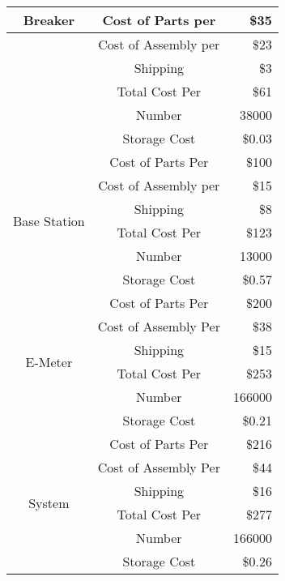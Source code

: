 \begin{table}
\caption{}
\begin{tabular}{|c|c|r|}
\multirow{6}{*}{Breaker} & Cost of Parts per    & \$35\\\hline
                         & Cost of Assembly per & \$23\\\hline
                         & Shipping             & \$3\\\hline
                         & Total Cost Per       & \$61\\\hline
                         & Number               & 38000\\\hline
                         & Storage Cost         & \$0.03\\\hline\hline
\multirow{6}{*}{Base Station} & Cost of Parts Per    & \$100\\\hline
                              & Cost of Assembly per & \$15\\\hline
                              & Shipping             & \$8\\\hline
                              & Total Cost Per       & \$123\\\hline
                              & Number               & 13000\\\hline
                              & Storage Cost         & \$0.57\\\hline\hline
\multirow{6}{*}{E-Meter} & Cost of Parts Per    & \$200\\\hline
                         & Cost of Assembly Per & \$38\\\hline
                         & Shipping             & \$15\\\hline
                         & Total Cost Per       & \$253\\\hline
                         & Number               & 166000\\\hline
                         & Storage Cost         & \$0.21\\\hline\hline
\multirow{6}{*}{System} & Cost of Parts Per    & \$216\\\hline
                        & Cost of Assembly Per & \$44\\\hline
                        & Shipping             & \$16\\\hline
                        & Total Cost Per       & \$277\\\hline
                        & Number               & 166000\\\hline
                        & Storage Cost         & \$0.26\\\hline\hline
\end{tabular}
\label{}
\end{table}
